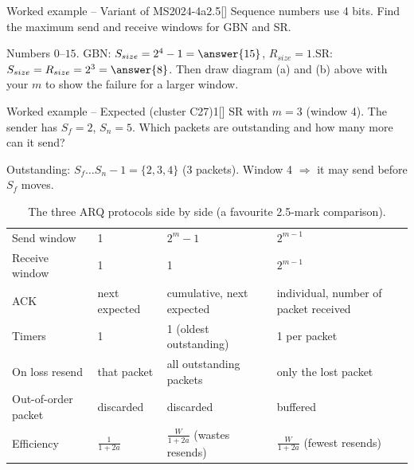 \begin{question}{Worked example -- Variant of MS2024-4a}{2.5}[]
Sequence numbers use 4 bits. Find the maximum send and receive windows for GBN and SR.
\end{question}
\begin{solution}[windows for $m=4$ (check: \texttt{checks/T16\_ex\_window.py})]
Numbers $0$--$15$. GBN: $S_{size}=2^4-1=\answer{15}$, $R_{size}=1$.\quad SR: $S_{size}=R_{size}=2^{3}=\answer{8}$.
Then draw diagram (a) and (b) above with your $m$ to show the failure for a larger window.
\end{solution}

\begin{question}{Worked example -- Expected (cluster C27)}{1}[]
SR with $m=3$ (window 4). The sender has $S_f=2$, $S_n=5$. Which packets are outstanding and how many more can it send?
\end{question}
\begin{solution}
Outstanding: $S_f\ldots S_n-1=\{2,3,4\}$ (3 packets). Window 4 $\Rightarrow$ it may send  before $S_f$ moves.
\end{solution}

\begin{table}[!htbp]\centering\footnotesize\zebra
\begin{tabularx}{\linewidth}{L{30mm}YYY}\toprule
{} &  &  & \\\midrule
Send window & 1 & $2^m-1$ & $2^{m-1}$\\
Receive window & 1 & 1 & $2^{m-1}$\\
ACK & next expected & cumulative, next expected & individual, number of packet received\\
Timers & 1 & 1 (oldest outstanding) & 1 per packet\\
On loss resend & that packet & all outstanding packets & only the lost packet\\
Out-of-order packet & discarded & discarded & buffered\\
Efficiency & $\frac{1}{1+2a}$ & $\frac{W}{1+2a}$ (wastes resends) & $\frac{W}{1+2a}$ (fewest resends)\\\bottomrule
\end{tabularx}
\caption{The three ARQ protocols side by side (a favourite 2.5-mark comparison).}
\end{table}

